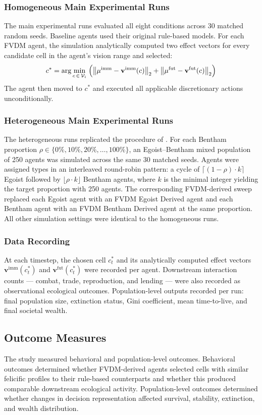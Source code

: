 \documentclass{icsthesis}
\begin{document}
\begin{mainmatter}
\subsubsection{Homogeneous Main Experimental Runs}
The main experimental runs evaluated all eight conditions across 30 matched random seeds. Baseline agents used their original rule-based models. For each FVDM agent, the simulation analytically computed two effect vectors for every candidate cell in the agent's vision range and selected:
\[
c^* = \arg\min_{c \,\in\, \mathcal{V}_i}\;\Bigl(\bigl\lVert \mu^{\mathrm{imm}} - \mathbf{v}^{\mathrm{imm}}(c)\bigr\rVert_2 + \bigl\lVert \mu^{\mathrm{fut}} - \mathbf{v}^{\mathrm{fut}}(c)\bigr\rVert_2\Bigr)
\]
The agent then moved to $c^*$ and executed all applicable discretionary actions unconditionally.

\subsubsection{Heterogeneous Main Experimental Runs}
The heterogeneous runs replicated the procedure of \citet{KremerHerman2024b}. For each Bentham proportion $\rho \in \{0\%, 10\%, 20\%, \ldots, 100\%\}$, an Egoist--Bentham mixed population of 250 agents was simulated across the same 30 matched seeds. Agents were assigned types in an interleaved round-robin pattern: a cycle of $\lceil(1{-}\rho) \cdot k\rceil$ Egoist followed by $\lfloor \rho \cdot k \rfloor$ Bentham agents, where $k$ is the minimal integer yielding the target proportion with 250 agents. The corresponding FVDM-derived sweep replaced each Egoist agent with an FVDM Egoist Derived agent and each Bentham agent with an FVDM Bentham Derived agent at the same proportion. All other simulation settings were identical to the homogeneous runs.

\subsubsection{Data Recording}
At each timestep, the chosen cell $c_t^*$ and its analytically computed effect vectors $\mathbf{v}^{\mathrm{imm}}(c_t^*)$ and $\mathbf{v}^{\mathrm{fut}}(c_t^*)$ were recorded per agent. Downstream interaction counts — combat, trade, reproduction, and lending — were also recorded as observational ecological outcomes. Population-level outputs recorded per run: final population size, extinction status, Gini coefficient, mean time-to-live, and final societal wealth.

\subsection{Outcome Measures}
The study measured behavioral and population-level outcomes. Behavioral outcomes determined whether FVDM-derived agents selected cells with similar felicific profiles to their rule-based counterparts and whether this produced comparable downstream ecological activity. Population-level outcomes determined whether changes in decision representation affected survival, stability, extinction, and wealth distribution.


\end{mainmatter}
\end{document}
